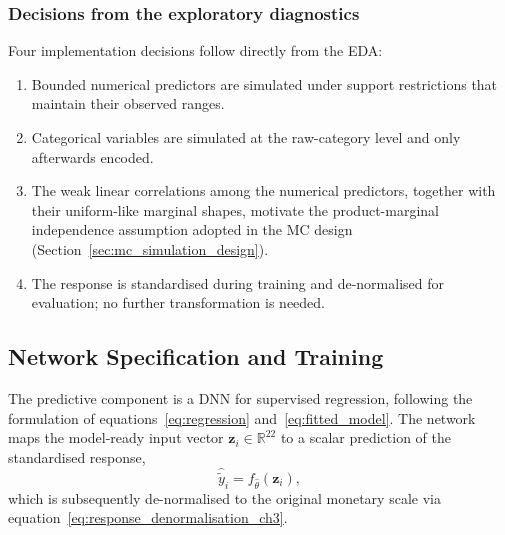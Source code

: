 
\subsubsection{Decisions from the exploratory diagnostics}
Four implementation decisions follow directly from the EDA:

\begin{enumerate}
    \item Bounded numerical predictors are simulated under support
          restrictions that maintain their observed ranges.
    \item Categorical variables are simulated at the raw-category level
          and only afterwards encoded.
    \item The weak linear correlations among the numerical predictors,
          together with their uniform-like marginal shapes, motivate the
          product-marginal independence assumption adopted in the MC
          design (Section~\ref{sec:mc_simulation_design}).
    \item The response is standardised during training and de-normalised
          for evaluation; no further transformation is needed.
\end{enumerate}

\subsection{Network Specification and Training}
\label{sec:dnn_specification_training}

The predictive component is a DNN for supervised
regression, following the formulation of equations~\eqref{eq:regression}
and~\eqref{eq:fitted_model}.  The network maps the model-ready input vector
$\mathbf{z}_i \in \mathbb{R}^{22}$ to a scalar prediction of the
standardised response,
\begin{equation}
    \widehat{\widetilde{y}}_i = f_{\widehat{\theta}}(\mathbf{z}_i),
    \label{eq:dnn_prediction_standardised_ch3}
\end{equation}
which is subsequently de-normalised to the original monetary scale via
equation~\eqref{eq:response_denormalisation_ch3}.

